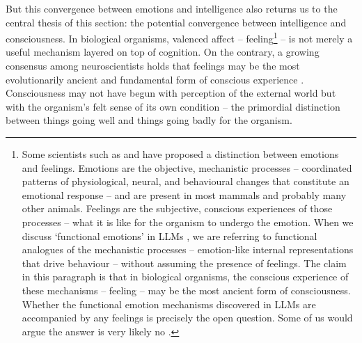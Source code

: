 \documentclass[11pt, a4paper, onecolumn, gdm]{google}
\begin{document}
But this convergence between emotions and intelligence also returns us to the central thesis of this section: the potential convergence between intelligence and consciousness.
In biological organisms, valenced affect -- feeling\footnote{Some scientists such as \citet{damasio1994} and \citet{ledoux1996} have proposed a distinction between emotions and feelings. Emotions are the objective, mechanistic processes -- coordinated patterns of physiological, neural, and behavioural changes that constitute an emotional response -- and are present in most mammals and probably many other animals. Feelings are the subjective, conscious experiences of those processes -- what it is like for the organism to undergo the emotion. When we discuss `functional emotions' in LLMs \citep[following][]{sofroniew2026}, we are referring to functional analogues of the mechanistic processes -- emotion-like internal representations that drive behaviour -- without assuming the presence of feelings. The claim in this paragraph is that in biological organisms, the conscious experience of these mechanisms -- feeling -- may be the most ancient form of consciousness. Whether the functional emotion mechanisms discovered in LLMs are accompanied by any feelings is precisely the open question. Some of us would argue the answer is very likely no \citep[e.g.][]{seth2024,seth2026stuff}.} -- is not merely a useful mechanism layered on top of cognition.
On the contrary, a growing consensus among neuroscientists holds that feelings may be the most evolutionarily ancient and fundamental form of conscious experience \citep{damasio1999,solms2021,panksepp1998,seth2021,kringelbach2026}.
Consciousness may not have begun with perception of the external world but with the organism's felt sense of its own condition -- the primordial distinction between things going well and things going badly for the organism.
\end{document}
